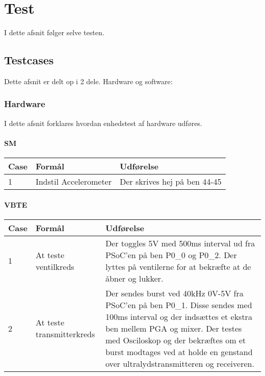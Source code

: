 \chapter{Test}
I dette afsnit følger selve testen.
\section{Testcases}
Dette afsnit er delt op i  2 dele. Hardware og software:\\
\subsection{Hardware}
I dette afsnit forklares hvordan enhedstest af hardware udføres.
\subsubsection{SM}
\begin{table}[H]
\centering
\begin{tabular}{| p{1.2cm}  | p{4.5cm} | p{8cm} |}
\hline
Case &Formål &Udførelse\\\hline
1 &Indstil Accelerometer &Der skrives hej på ben 44-45\\\hline
\end{tabular}
\end{table}
\subsubsection{VBTE}
\begin{table}[H]
\centering
\begin{tabular}{| p{1.2cm}  | p{4.5cm} | p{8cm} |}
\hline
Case &Formål &Udførelse\\\hline
1 &At teste ventilkreds &Der toggles 5V med 500ms interval ud fra PSoC'en på ben P0\_0 og P0\_2. Der lyttes på ventilerne for at bekræfte at de åbner og lukker.\\\hline
2 &At teste transmitterkreds &Der sendes burst ved 40kHz 0V-5V fra PSoC'en på ben P0\_1. Disse sendes med 100ms interval og der indsættes et ekstra ben mellem PGA og mixer. Der testes med Osciloskop og der bekræftes om et burst modtages ved at holde en genstand over ultralydstransmitteren og receiveren.\\\hline
\end{tabular}
\end{table}
